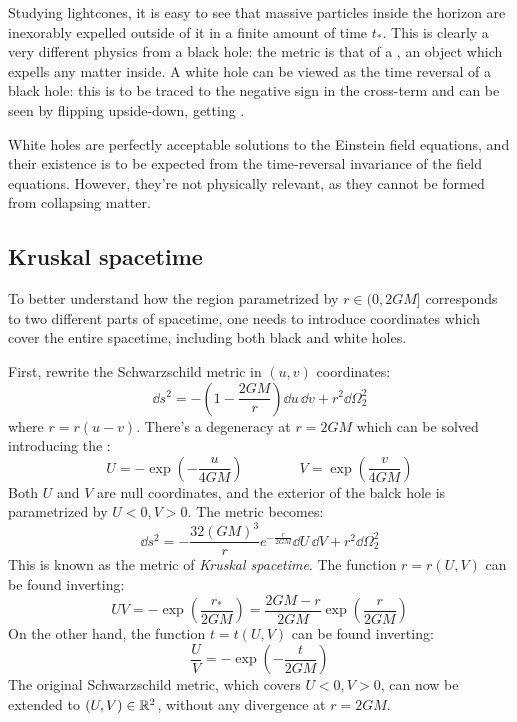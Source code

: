 Studying lightcones, it is easy to see that massive particles inside the horizon are inexorably expelled outside of it in a finite amount of time $ t_* $. This is clearly a very different physics from a black hole: the metric  is that of a , an object which expells any matter inside. A white hole can be viewed as the time reversal of a black hole: this is to be traced to the negative sign in the cross-term and can be seen by flipping  upside-down, getting .

White holes are perfectly acceptable solutions to the Einstein field equations, and their existence is to be expected from the time-reversal invariance of the field equations. However, they're not physically relevant, as they cannot be formed from collapsing matter.

\subsection{Kruskal spacetime}

To better understand how the region parametrized by $ r \in (0, 2GM] $ corresponds to two different parts of spacetime, one needs to introduce coordinates which cover the entire spacetime, including both black and white holes.

First, rewrite the Schwarzschild metric in $ (u,v) $ coordinates:
\begin{equation*}
  \dd s^2 = - \left( 1 - \frac{2GM}{r} \right) \dd u\,\dd v + r^2 \dd \Omega_2^2
\end{equation*}
where $ r = r(u - v) $. There's a degeneracy at $ r = 2GM $ which can be solved introducing the :
\begin{equation}
  U = - \exp \left( - \frac{u}{4GM} \right)
  \qquad \qquad
  V = \exp \left( \frac{v}{4GM} \right)
\end{equation}
Both $ U $ and $ V $ are null coordinates, and the exterior of the balck hole is parametrized by $ U < 0, V > 0 $. The metric becomes:
\begin{equation}
  \dd s^2 = - \frac{32 (GM)^3}{r} e^{-\frac{r}{2GM}} \dd U\,\dd V + r^2 \dd \Omega_2^2
  \label{eq:kruskal-metric}
\end{equation}
This is known as the metric of \textit{Kruskal spacetime}. The function $ r = r(U,V) $ can be found inverting:
\begin{equation}
  UV = - \exp \left( \frac{r_*}{2GM} \right) = \frac{2GM - r}{2GM} \exp \left( \frac{r}{2GM} \right)
  \label{eq:kruskal-coord-1}
\end{equation}
On the other hand, the function $ t = t(U,V) $ can be found inverting:
\begin{equation}
  \frac{U}{V} = - \exp \left( - \frac{t}{2GM} \right)
  \label{eq:kruskal-coord-2}
\end{equation}
The original Schwarzschild metric, which covers $ U < 0, V > 0 $, can now be extended to $ (U,V) \in \mathbb{R}^2 $, without any divergence at $ r = 2GM $.

